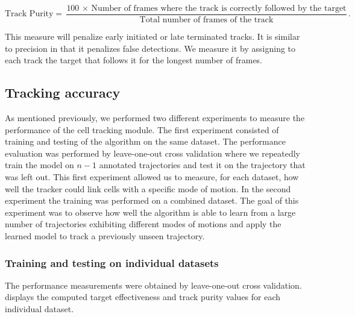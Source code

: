 	\[
		\text{Track Purity} = \frac{\text{100 $\times$ Number of frames where the track is correctly followed by the target}}{\text{Total number of frames of the track}}\text{.}
	\]
	
	This measure will penalize early initiated or late terminated tracks. It is similar to precision in that it penalizes false detections. We measure it by assigning to each track the target that follows it for the longest number of frames. 
	
	\subsection{Tracking accuracy }
	
	
		As mentioned previously, we performed two different experiments to measure the performance of the cell tracking module. The first experiment consisted of training and testing of the algorithm on the same dataset. The performance evaluation was performed by leave-one-out cross validation where we repeatedly train the model on $n-1$ annotated trajectories and test it on the trajectory that was left out. This first experiment allowed us to measure, for each dataset, how well the tracker could link cells with a specific mode of motion. In the second experiment the training was performed on a combined dataset. The goal of this experiment was to observe how well the algorithm is able to learn from a large number of trajectories exhibiting different modes of motions and apply the learned model to track a previously unseen trajectory.
	
		\subsubsection{Training and testing on individual datasets \statusnew}
		
		The performance measurements were obtained by leave-one-out cross validation.  displays the computed target effectiveness and track purity values for each individual dataset.
		
